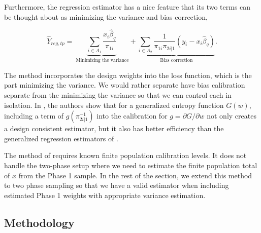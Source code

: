 \documentclass[12pt]{article}
\begin{document}

Furthermore, the regression estimator
has a nice feature that its two terms can be thought about as minimizing the
variance and bias correction,

$$ \hat Y_{reg, tp} 
= \underbrace{\sum_{i \in A_1} \frac{x_i \hat \beta_q}{\pi_{1i}}}_{
  \text{ Minimizing the variance}} + \underbrace{\sum_{i \in A_2}
\frac{1}{\pi_{1i}\pi_{2i|1}} (y_i - x_i \hat \beta_q)}_{
\text{Bias correction}}.$$

The \cite{deville1992calibration} method incorporates the design weights into
the loss function, which is the part minimizing the variance. We would rather
separate have bias calibration separate from the minimizing the variance so that
we can control each in isolation. In
\cite{kwon2024debiased}, the authors show that for a generalized entropy
function $G(w)$, including a term of $g(\pi_{2i|1}^{-1})$ into the calibration
for $g = \partial G / \partial w$ not only creates a design consistent
estimator, but it also has better efficiency than the generalized regression
estimators of \cite{deville1992calibration}.

The method of \cite{kwon2024debiased} requires known finite population 
calibration levels. It does not handle the
two-phase setup where we need to estimate the finite population total of $x$
from the Phase 1 sample. In the rest of the section, we extend this method to 
two phase sampling so that we have a valid 
estimator when including estimated Phase 1 weights with appropriate variance
estimation.

\subsection{Methodology}

\end{document}
